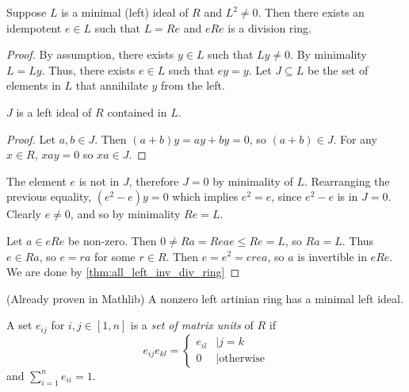 \begin{theorem}
  \label{thm:brauer_lemma}
  \leanok
  Suppose $L$ is a minimal (left) ideal of $R$ and $L^2 \neq 0$. Then there exists an idempotent $e \in L$ such that $L = Re$ and $eRe$ is a division ring.
\end{theorem}
\begin{proof}
  \leanok
  By assumption, there exists $y \in L$ such that $Ly \neq 0$. By minimality $L = Ly$. Thus, there exists $e \in L$ such that $e y = y$. Let $J \subseteq L$ be the set of elements in $L$ that annihilate $y$ from the left.
  \begin{claim}
    $J$ is a left ideal of $R$ contained in $L$.
  \end{claim}
  \begin{proof}
    \leanok
    Let $a, b \in J$. Then $(a + b) y = a y + b y = 0$, so $(a + b) \in J$. For any $x \in R$, $x a y = 0$ so $xa \in J$.
  \end{proof}
  The element $e$ is not in $J$, therefore $J = 0$ by minimality of $L$.
  Rearranging the previous equality, $(e^2 - e) y = 0$ which implies $e^2 = e$, since $e^2 - e$ is in $J = 0$. Clearly $e \neq 0$, and so by minimality $Re = L$.

  Let $a \in eRe$ be non-zero. Then $0 \neq Ra = Reae \leq Re = L$, so $Ra = L$. Thus $e \in Ra$, so $e = r a$ for some $r \in R$. Then $e = e^2 = e r e a$, so $a$ is invertible in $eRe$. We are done by \ref{thm:all_left_inv_div_ring}
\end{proof}

\begin{theorem}
  \label{thm:artinian_has_minimal_left_ideal}
  \leanok
  (Already proven in Mathlib) A nonzero left artinian ring has a minimal left ideal.
\end{theorem}

\begin{definition}
  \label{def:matrixunits}
  \leanok
  A set $e_{ij}$ for $i, j \in [1, n]$ is a \textit{set of matrix units} of $R$ if
  $$
    e_{ij}e_{kl} =
    \begin{cases}
      e_{il} & \mid j = k            \\
      0      & \mid \text{otherwise}\end{cases}
  $$
  and $\sum_{i=1}^n e_{ii} = 1$.
\end{definition}

